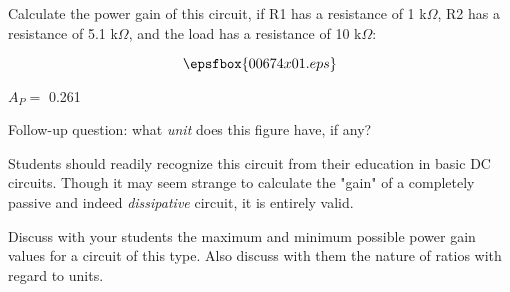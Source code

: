 

Calculate the power gain of this circuit, if R1 has a resistance of 1 k$\Omega$, R2 has a resistance of 5.1 k$\Omega$, and the load has a resistance of 10 k$\Omega$:

$$\epsfbox{00674x01.eps}$$







$A_P =$ 0.261

\vskip 10pt

Follow-up question: what {\it unit} does this figure have, if any?







Students should readily recognize this circuit from their education in basic DC circuits.  Though it may seem strange to calculate the "gain" of a completely passive and indeed {\it dissipative} circuit, it is entirely valid.

Discuss with your students the maximum and minimum possible power gain values for a circuit of this type.  Also discuss with them the nature of ratios with regard to units.




